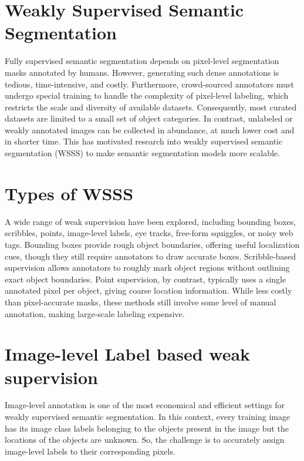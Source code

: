 
\section{Weakly Supervised Semantic Segmentation}
\label{sec:weakly-supervised}
Fully supervised semantic segmentation depends on pixel-level segmentation masks annotated by humans. However, generating such dense annotations is tedious, time-intensive, and costly. Furthermore, crowd-sourced annotators must undergo special training to handle the complexity of pixel-level labeling, which restricts the scale and diversity of available datasets. Consequently, most curated datasets are limited to a small set of object categories. In contrast, unlabeled or weakly annotated images can be collected in abundance, at much lower cost and in shorter time. This has motivated research into weakly supervised semantic segmentation (WSSS) to make semantic segmentation models more scalable.


\section{Types of WSSS}
\label{sec:types-weakly-supervised}
A wide range of weak supervision have been explored, including bounding boxes, scribbles, points, image-level labels,  eye tracks, free-form squiggles, or noisy web tags. Bounding boxes provide rough object boundaries, offering useful localization cues, though they still require annotators to draw accurate boxes.  Scribble-based supervision allows annotators to roughly mark object regions without outlining exact object boundaries. Point supervision, by contrast, typically uses a single annotated pixel per object, giving coarse location information. While less costly than pixel-accurate masks, these methods still involve some level of manual annotation, making large-scale labeling expensive.


\section{Image-level Label based weak supervision}
\label{sec:image-level-label}
Image-level annotation is one of the most economical and efficient settings for weakly supervised semantic segmentation. In this context, every training image has its image class labels belonging to the objects present in the image but the locations of the objects are unknown. So, the challenge is to accurately assign image-level labels to their corresponding pixels.

